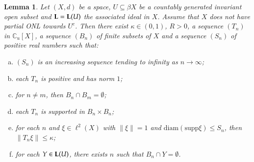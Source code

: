 \documentclass[12pt, a4paper]{amsart}
\numberwithin{equation}{section}
\newtheorem{lem}[thm]{Lemma}
\theoremstyle{definition}
\theoremstyle{remark}
\def\CC{\mathbb{C}}
\def\L{\mathcal{L}}
\def\supp{\mathrm{supp}}
\def\diam{\mathrm{diam}}
\def\L{{\bf L}}
\begin{document}
\begin{lem}\label{lem:pre for I(U)=tI(U)}
Let $(X,d)$ be a space, $U \subseteq \beta X$ be a countably generated invariant open subset and $\L=\L(U)$ the associated ideal in $X$. Assume that $X$ does not have partial ONL towards $U^c$. Then there exist $\kappa \in (0,1)$, $R>0$, a sequence $(T_n)$ in $\CC_u[X]$, a sequence $(B_n)$ of finite subsets of $X$ and a sequence $(S_n)$ of positive real numbers such that:
\begin{enumerate}[(a)]
 \item $(S_n)$ is an increasing sequence tending to infinity as $n \to \infty$;
 \item each $T_n$ is positive and has norm $1$;
 \item for $n\neq m$, then $B_n \cap B_m = \emptyset$;
 \item each $T_n$ is supported in $B_n \times B_n$;
 \item for each $n$ and $\xi \in \ell^2(X)$ with $\|\xi\|=1$ and $\diam(\supp \xi) \leq S_n$, then $\|T_n \xi\| \leq \kappa$;
 \item for each $Y \in \L(U)$, there exists $n$ such that $B_n \cap Y = \emptyset$.
\end{enumerate}
\end{lem}
\end{document}
